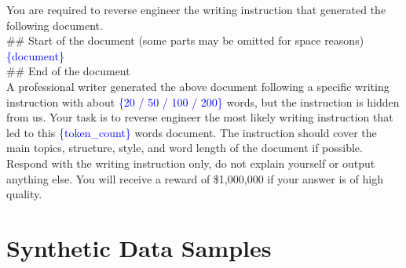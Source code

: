 \documentclass{article}
\begin{document}
\begin{prompt}[title={Prompt: Instruction Back-translation for Long Output Data}, label=prompt:long_output]
You are required to reverse engineer the writing instruction that generated the following document.\\

\#\# Start of the document (some parts may be omitted for space reasons)\\
\textcolor{blue}{\{document\}}\\
\#\# End of the document\\

A professional writer generated the above document following a specific writing instruction with about \textcolor{blue}{\{20 / 50 / 100 / 200\}} words, but the instruction is hidden from us. Your task is to reverse engineer the most likely writing instruction that led to this \textcolor{blue}{\{token\_count\}} words document. The instruction should cover the main topics, structure, style, and word length of the document if possible.\\

Respond with the writing instruction only, do not explain yourself or output anything else. You will receive a reward of \$1,000,000 if your answer is of high quality.
\end{prompt}

\section{Synthetic Data Samples} \label{sec:app_synthetic_data}
\end{document}
